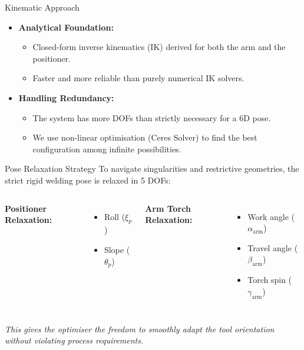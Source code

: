 \documentclass[10pt, aspectratio=169]{beamer}
\begin{document}
\begin{frame}{Kinematic Approach}
    \begin{itemize}
        \item \textbf{Analytical Foundation:}
        \begin{itemize}
            \item Closed-form inverse kinematics (IK) derived for both the arm and the positioner.
            \item Faster and more reliable than purely numerical IK solvers.
        \end{itemize}
        \item \textbf{Handling Redundancy:}
        \begin{itemize}
            \item The system has more DOFs than strictly necessary for a 6D pose.
            \item We use non-linear optimisation (Ceres Solver) to find the best configuration among infinite possibilities.
        \end{itemize}
    \end{itemize}
\end{frame}

\begin{frame}{Pose Relaxation Strategy}
    To navigate singularities and restrictive geometries, the strict rigid welding pose is relaxed in 5 DOFs:
    
    \vspace{0.3cm}
    \begin{columns}
        \textbf{Positioner Relaxation:}
        \begin{itemize}
            \item Roll ($\xi_{p}$)
            \item Slope ($\theta_{p}$)
        \end{itemize}
        
        \textbf{Arm Torch Relaxation:}
        \begin{itemize}
            \item Work angle ($\alpha_{\mathrm{arm}}$)
            \item Travel angle ($\beta_{\mathrm{arm}}$)
            \item Torch spin ($\gamma_{\mathrm{arm}}$)
        \end{itemize}
    \end{columns}
    
    \vspace{0.5cm}
    \begin{center}
        \textit{This gives the optimiser the freedom to smoothly adapt the tool orientation without violating process requirements.}
    \end{center}
\end{frame}
\end{document}
